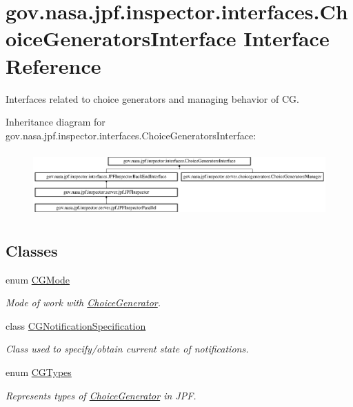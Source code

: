 \hypertarget{interfacegov_1_1nasa_1_1jpf_1_1inspector_1_1interfaces_1_1_choice_generators_interface}{}\section{gov.\+nasa.\+jpf.\+inspector.\+interfaces.\+Choice\+Generators\+Interface Interface Reference}
\label{interfacegov_1_1nasa_1_1jpf_1_1inspector_1_1interfaces_1_1_choice_generators_interface}


Interfaces related to choice generators and managing behavior of CG.  


Inheritance diagram for gov.\+nasa.\+jpf.\+inspector.\+interfaces.\+Choice\+Generators\+Interface\+:\begin{figure}[H]
\begin{center}
\leavevmode
\includegraphics[height=2.500000cm]{interfacegov_1_1nasa_1_1jpf_1_1inspector_1_1interfaces_1_1_choice_generators_interface}
\end{center}
\end{figure}
\subsection*{Classes}
\begin{DoxyCompactItemize}
\item 
enum \hyperlink{enumgov_1_1nasa_1_1jpf_1_1inspector_1_1interfaces_1_1_choice_generators_interface_1_1_c_g_mode}{C\+G\+Mode}
\begin{DoxyCompactList}\small\item\em Mode of work with \hyperlink{}{Choice\+Generator}. \end{DoxyCompactList}\item 
class \hyperlink{classgov_1_1nasa_1_1jpf_1_1inspector_1_1interfaces_1_1_choice_generators_interface_1_1_c_g_notification_specification}{C\+G\+Notification\+Specification}
\begin{DoxyCompactList}\small\item\em Class used to specify/obtain current state of notifications. \end{DoxyCompactList}\item 
enum \hyperlink{enumgov_1_1nasa_1_1jpf_1_1inspector_1_1interfaces_1_1_choice_generators_interface_1_1_c_g_types}{C\+G\+Types}
\begin{DoxyCompactList}\small\item\em Represents types of \hyperlink{}{Choice\+Generator} in J\+PF. \end{DoxyCompactList}\end{DoxyCompactItemize}
